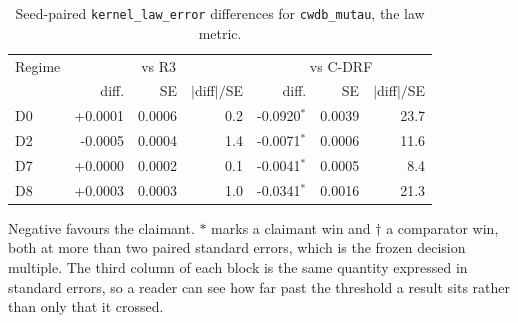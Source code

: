 \begin{table}[htbp]
\centering
\caption{Seed-paired \texttt{kernel\_law\_error} differences for \texttt{cwdb\_mutau}, the law metric.}
\label{tab:p55-paired-mutau-law}
\scriptsize
\setlength{\tabcolsep}{4pt}
\begin{tabular}{@{}lrrrrrr@{}}
\toprule
Regime & \multicolumn{3}{c}{vs R3} & \multicolumn{3}{c}{vs C-DRF} \\
  & diff. & SE & $|$diff$|/$SE & diff. & SE & $|$diff$|/$SE \\
\midrule
D0 & +0.0001 & 0.0006 & 0.2 & -0.0920$^{\ast}$ & 0.0039 & 23.7 \\
D2 & -0.0005 & 0.0004 & 1.4 & -0.0071$^{\ast}$ & 0.0006 & 11.6 \\
D7 & +0.0000 & 0.0002 & 0.1 & -0.0041$^{\ast}$ & 0.0005 & 8.4 \\
D8 & +0.0003 & 0.0003 & 1.0 & -0.0341$^{\ast}$ & 0.0016 & 21.3 \\
\bottomrule
\end{tabular}
\par\vspace{2pt}\parbox{0.96\textwidth}{\scriptsize Negative favours the claimant. $\ast$ marks a claimant win and $\dagger$ a comparator win, both at more than two paired standard errors, which is the frozen decision multiple. The third column of each block is the same quantity expressed in standard errors, so a reader can see how far past the threshold a result sits rather than only that it crossed.}
\end{table}

